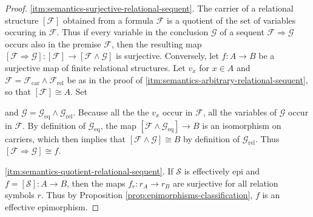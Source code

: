 \documentclass[a4paper]{article}
\theoremstyle{remark}
\theoremstyle{definition}
\begin{document}
\begin{proof}
  \ref{itm:semantics-surjective-relational-sequent}.
  The carrier of a relational structure $[\mathcal{F}]$ obtained from a formula $\mathcal{F}$ is a quotient of the set of variables occuring in $\mathcal{F}$.
  Thus if every variable in the conclusion $\mathcal{G}$ of a sequent $\mathcal{F} \Rightarrow \mathcal{G}$ occurs also in the premise $\mathcal{F}$, then the resulting map $[\mathcal{F} \Rightarrow \mathcal{G}]: [\mathcal{F}] \rightarrow [\mathcal{F} \land \mathcal{G}]$ is surjective.
  Conversely, let $f : A \rightarrow B$ be a surjective map of finite relational structures.
  Let $v_x$ for $x \in A$ and $\mathcal{F} = \mathcal{F}_\mathrm{car} \land \mathcal{F}_\mathrm{rel}$ be as in the proof of \ref{itm:semantics-arbitrary-relational-sequent}, so that $[\mathcal{F}] \cong A$.
  Set
  and $\mathcal{G} = \mathcal{G}_\mathrm{eq} \land \mathcal{G}_\mathrm{rel}$.
  Because all the the $v_x$ occur in $\mathcal{F}$, all the variables of $\mathcal{G}$ occur in $\mathcal{F}$.
  By definition of $\mathcal{G}_\mathrm{eq}$, the map $[\mathcal{F} \land \mathcal{G}_\mathrm{eq}] \rightarrow B$ is an isomorphism on carriers, which then implies that $[\mathcal{F} \land \mathcal{G}] \cong B$ by definition of $\mathcal{G}_\mathrm{rel}$.
  Thus $[\mathcal{\mathcal{F}} \Rightarrow \mathcal{G}] \cong f$.

 \ref{itm:semantics-quotient-relational-sequent}.
  If $\mathcal{S}$ is effectively epi and $f = [\mathcal{S}] : A \rightarrow B$, then the maps $f_r : r_A \rightarrow r_B$ are surjective for all relation symbols $r$.
  Thus by Proposition \ref{prop:epimorphisms-classification}, $f$ is an effective epimorphism.


\end{proof}
\end{document}
